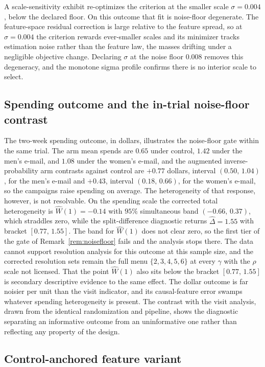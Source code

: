 \documentclass[11pt]{article}
\begin{document}
A scale-sensitivity exhibit re-optimizes the criterion at the smaller scale $\sigma=0.004$, below the declared floor. On this outcome that fit is noise-floor degenerate. The feature-space residual correction is large relative to the feature spread, so at $\sigma=0.004$ the criterion rewards ever-smaller scales and its minimizer tracks estimation noise rather than the feature law, the masses drifting under a negligible objective change. Declaring $\sigma$ at the noise floor $0.008$ removes this degeneracy, and the monotone sigma profile confirms there is no interior scale to select.


\subsection{Spending outcome and the in-trial noise-floor contrast}\label{sec:app:hillstrom_spend}

The two-week spending outcome, in dollars, illustrates the noise-floor gate within the same trial. The arm mean spends are $0.65$ under control, $1.42$ under the men's e-mail, and $1.08$ under the women's e-mail, and the augmented inverse-probability arm contrasts against control are $+0.77$ dollars, interval $(0.50,\,1.04)$, for the men's e-mail and $+0.43$, interval $(0.18,\,0.66)$, for the women's e-mail, so the campaigns raise spending on average. The heterogeneity of that response, however, is not resolvable. On the spending scale the corrected total heterogeneity is $\widehat W(1)=-0.14$ with $95\%$ simultaneous band $(-0.66,\,0.37)$, which straddles zero, while the split-difference diagnostic returns $\widehat\Delta=1.55$ with bracket $[0.77,\,1.55]$. The band for $\widehat W(1)$ does not clear zero, so the first tier of the gate of Remark~\ref{rem:noisefloor} fails and the analysis stops there. The data cannot support resolution analysis for this outcome at this sample size, and the corrected resolution sets remain the full menu $\{2,3,4,5,6\}$ at every $\gamma$ with the $\rho$ scale not licensed. That the point $\widehat W(1)$ also sits below the bracket $[0.77,\,1.55]$ is secondary descriptive evidence to the same effect. The dollar outcome is far noisier per unit than the visit indicator, and its causal-feature error swamps whatever spending heterogeneity is present. The contrast with the visit analysis, drawn from the identical randomization and pipeline, shows the diagnostic separating an informative outcome from an uninformative one rather than reflecting any property of the design.

\subsection{Control-anchored feature variant}\label{sec:app:hillstrom_anchored}
\end{document}
